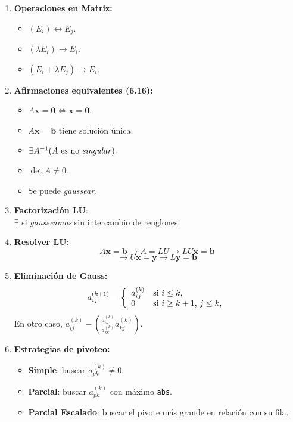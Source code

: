 \documentclass[10pt,a4paper]{article}
\begin{document}
\begin{multicols}{2}
\begin{enumerate}
\item \textbf{Operaciones en Matriz:}
\begin{itemize}
\item $(E_i) \leftrightarrow E_j$.
\item $(\lambda E_i)  \rightarrow E_i$.
\item $(E_i + \lambda E_j) \rightarrow E_i$.
\end{itemize}
%
\item \textbf{Afirmaciones equivalentes (6.16):}
\begin{itemize}
\item $A\mathbf{x}=\mathbf{0} \iff \mathbf{x}=\mathbf{0}$.
\item $A\mathbf{x}=\mathbf{b} \text{ tiene solución única}$.
\item $\exists A^{-1} (A \text{ es no \textit{singular}})$.
\item $\det A \neq 0$.
\item Se puede \textit{gaussear}.
\end{itemize}
%
\item \textbf{Factorización LU}: \\
$\exists$ si \textit{gausseamos} sin intercambio de renglones.
%
\item \textbf{Resolver LU:} 
\[A\mathbf{x}=\mathbf{b} \rightarrow A=LU \rightarrow LU\mathbf{x}=\mathbf{b} \]
\[ \rightarrow U\mathbf{x}=\mathbf{y}\rightarrow L\mathbf{y}=\mathbf{b}\]
%
\item \textbf{Eliminación de Gauss:}
\begin{align*}
  a_{ij}^{(k+1)} = \left\{ 
  \begin{array}{l l}
    a_{ij}^{(k)} & \text{si $i\leq k$},\\
    0 & \text{si $i \geq k+1$, $j \leq k$},\\
  \end{array} 
  \right.
\end{align*}
En otro caso, $a_{ij}^{(k)}-\left(\frac{a_{ik}^{(k)}}{a_{kk}^{(k)}}a_{kj}^{(k)}\right)$.
\item \textbf{Estrategias de pivoteo:}
\begin{itemize}
\item \textbf{Simple}: buscar $a^{(k)}_{pk}\neq 0$.
\item \textbf{Parcial}: buscar $a^{(k)}_{pk}$ con máximo \texttt{abs}.
\item \textbf{Parcial Escalado}: buscar el pivote más grande en relación con su fila.

\end{itemize}
\end{enumerate}
\end{multicols}
\end{document}
